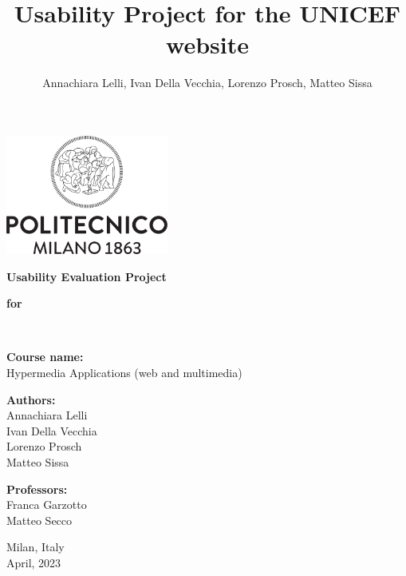\documentclass[a4paper,12pt]{article}
\author{Annachiara Lelli, Ivan Della Vecchia, Lorenzo Prosch, Matteo Sissa}
\title{Usability Project for the UNICEF website}
\newcommand{\inspectionDir}{root/1.Inspection}
\newcommand{\utDir}{root/2.UserTesting}
\newcommand{\conclusionDir}{root/3.Conclusion}
\newcommand{\annexDir}{root/4.Annex}
\begin{document}
	
	\begin{center}
		
		
	\thispagestyle{empty}
		
	\includegraphics[width=0.4\textwidth]{res/Logo_poli}
	
	\vspace{2cm}
	
	\textbf{\fontsize{28}{\baselineskip}\selectfont Usability Evaluation Project}\\
	
	\vspace{0.6cm}
	
	\textbf{\fontsize{17}{\baselineskip}\selectfont for }\\
	
	\vspace{0.6cm}
	
	\textbf{\fontsize{28}{\baselineskip}\selectfont {UNICEF's website}}\\
	
	\vspace{2cm}
	
	\textbf{Course name:}\\ 	{
		\setlength{\baselineskip}{1.4\baselineskip}
		Hypermedia Applications (web and multimedia)\\	
	}
	
	\vspace{1cm}
	
	
		\textbf{Authors:}\\
	{
		\setlength{\baselineskip}{1.4\baselineskip}
		Annachiara Lelli\\
		Ivan Della Vecchia\\
		Lorenzo Prosch\\
		Matteo Sissa	\\
	}
	
	\vspace{1cm}
	
	\textbf{Professors:}\\
	{
	\setlength{\baselineskip}{1.4\baselineskip}
	Franca Garzotto\\
	Matteo Secco\\
}
	
	\vspace{3cm}
	

	{\scriptsize Milan, Italy \\ April, 2023}
	
	\end{center}
	
	
	\clearpage
 	\hypersetup{linkcolor=black}
	\tableofcontents
	\thispagestyle{empty}
	
	
	\renewcommand{\rmdefault}{phv}
	\renewcommand{\normalsize}{\fontsize{14}{17.4}\selectfont}
	
	
	
	
	
	
	
\end{document}
